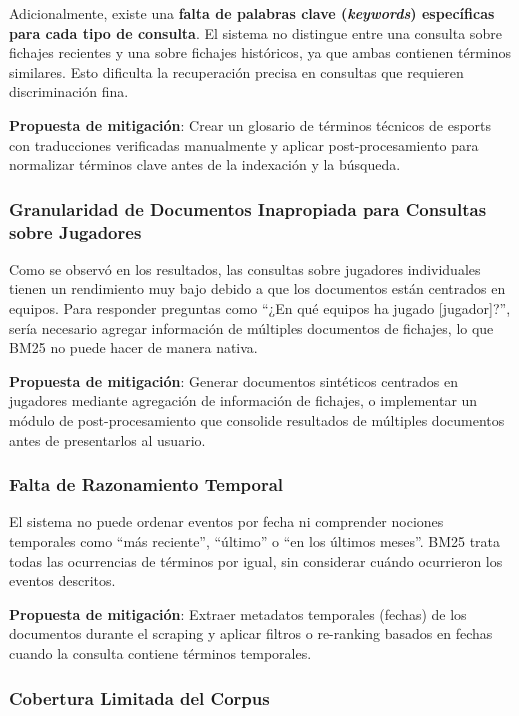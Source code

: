 Adicionalmente, existe una \textbf{falta de palabras clave (\textit{keywords}) específicas para cada tipo de consulta}. El sistema no distingue entre una consulta sobre fichajes recientes y una sobre fichajes históricos, ya que ambas contienen términos similares. Esto dificulta la recuperación precisa en consultas que requieren discriminación fina.

\textbf{Propuesta de mitigación}: Crear un glosario de términos técnicos de esports con traducciones verificadas manualmente y aplicar post-procesamiento para normalizar términos clave antes de la indexación y la búsqueda.

\subsubsection{Granularidad de Documentos Inapropiada para Consultas sobre Jugadores}

Como se observó en los resultados, las consultas sobre jugadores individuales tienen un rendimiento muy bajo debido a que los documentos están centrados en equipos. Para responder preguntas como \enquote{¿En qué equipos ha jugado [jugador]?}, sería necesario agregar información de múltiples documentos de fichajes, lo que BM25 no puede hacer de manera nativa.

\textbf{Propuesta de mitigación}: Generar documentos sintéticos centrados en jugadores mediante agregación de información de fichajes, o implementar un módulo de post-procesamiento que consolide resultados de múltiples documentos antes de presentarlos al usuario.

\subsubsection{Falta de Razonamiento Temporal}

El sistema no puede ordenar eventos por fecha ni comprender nociones temporales como \enquote{más reciente}, \enquote{último} o \enquote{en los últimos meses}. BM25 trata todas las ocurrencias de términos por igual, sin considerar cuándo ocurrieron los eventos descritos.

\textbf{Propuesta de mitigación}: Extraer metadatos temporales (fechas) de los documentos durante el scraping y aplicar filtros o re-ranking basados en fechas cuando la consulta contiene términos temporales.

\subsubsection{Cobertura Limitada del Corpus}

